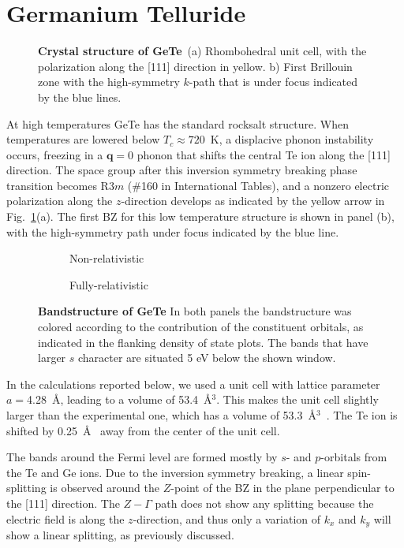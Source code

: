 \section{Germanium Telluride}
\begin{figure}[h]
\caption{\label{fig:Rashba_crystal}{\bf Crystal structure of GeTe}~(a) Rhombohedral unit cell, with the polarization along the [111] direction in yellow. b) First Brillouin zone with the high-symmetry $k$-path that is under focus indicated by the blue lines.}
\end{figure}
At high temperatures GeTe has the standard rocksalt structure.
When temperatures are lowered below $T_c \approx 720$~K\cite{DiSante2013}, a displacive phonon instability occurs, freezing in a $\bm{q} = 0$ phonon that shifts the central Te ion along the [111] direction\cite{Rabe1987}.
The space group after this inversion symmetry breaking phase transition becomes R$3m$ (\#160 in International Tables), and a nonzero electric polarization along the $z$-direction develops as indicated by the yellow arrow in Fig.~\ref{fig:Rashba_crystal}(a). The first BZ for this low temperature structure is shown in panel (b), with the high-symmetry path under focus indicated by the blue line.


\begin{figure}[b!]
	\begin{subfigure}[b]{0.49\textwidth}
	\caption{Non-relativistic}
	\end{subfigure}
	\begin{subfigure}[b]{0.49\textwidth}
	\caption{Fully-relativistic}
	\end{subfigure}
\caption{\label{fig:Rashba_bands_dos}{\bf Bandstructure of GeTe} In both panels the bandstructure was colored according to the contribution of the constituent orbitals, as indicated in the flanking density of state plots. The bands that have larger $s$ character are situated 5 eV below the shown window.}
\end{figure}
In the calculations reported below, we used a unit cell with lattice parameter $a=$4.28~\AA, leading to a volume of 53.4~\AA$^3$.
This makes the unit cell slightly larger than the experimental one, which has a volume of 53.3~\AA$^3$~\cite{Serebryanaya1995}.
The Te ion is shifted by 0.25~\AA~ away from the center of the unit cell.

The bands around the Fermi level are formed mostly by $s$- and $p$-orbitals from the Te and Ge ions.
Due to the inversion symmetry breaking, a linear spin-splitting is observed around the $Z$-point of the BZ in the plane perpendicular to the [111] direction.
The $Z-\Gamma$ path does not show any splitting because the electric field is along the $z$-direction, and thus only a variation of $k_x$ and $k_y$ will show a linear splitting, as previously discussed.

